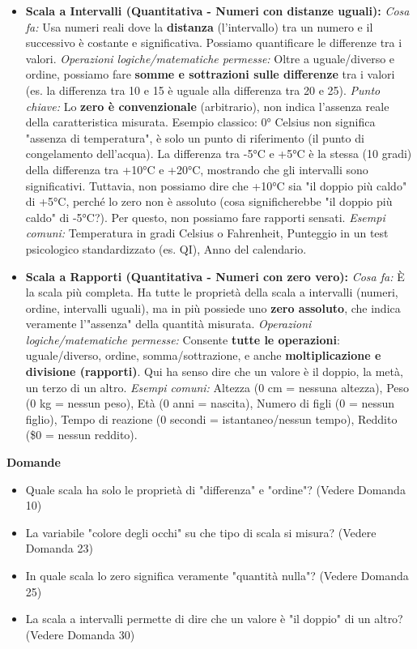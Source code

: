 \documentclass[12pt, a4paper]{article}
\newenvironment{reflectionbox}{%
    \begin{framed}\par\medskip\noindent
    \textbf{\color{boxtitlecolor}Domande} \par
    \begin{itemize}[leftmargin=*, label=$\blacktriangleright$]
}{%
    \end{itemize}\par\medskip
    \end{framed}
}
\begin{document}
\begin{itemize}
\begin{itemize}
            \item \textbf{Scala a Intervalli (Quantitativa - Numeri con distanze uguali):}
                \subitem \textit{Cosa fa:} Usa numeri reali dove la \textbf{distanza} (l'intervallo) tra un numero e il successivo è costante e significativa. Possiamo quantificare le differenze tra i valori.
                \subitem \textit{Operazioni logiche/matematiche permesse:} Oltre a uguale/diverso e ordine, possiamo fare \textbf{somme e sottrazioni sulle differenze} tra i valori (es. la differenza tra 10 e 15 è uguale alla differenza tra 20 e 25).
                \subitem \textit{Punto chiave:} Lo \textbf{zero è convenzionale} (arbitrario), non indica l'assenza reale della caratteristica misurata. Esempio classico: 0° Celsius non significa "assenza di temperatura", è solo un punto di riferimento (il punto di congelamento dell'acqua). La differenza tra -5°C e +5°C è la stessa (10 gradi) della differenza tra +10°C e +20°C, mostrando che gli intervalli sono significativi. Tuttavia, non possiamo dire che +10°C sia "il doppio più caldo" di +5°C, perché lo zero non è assoluto (cosa significherebbe "il doppio più caldo" di -5°C?). Per questo, non possiamo fare rapporti sensati.
                \subitem \textit{Esempi comuni:} Temperatura in gradi Celsius o Fahrenheit, Punteggio in un test psicologico standardizzato (es. QI), Anno del calendario.

            \item \textbf{Scala a Rapporti (Quantitativa - Numeri con zero vero):}
                \subitem \textit{Cosa fa:} È la scala più completa. Ha tutte le proprietà della scala a intervalli (numeri, ordine, intervalli uguali), ma in più possiede uno \textbf{zero assoluto}, che indica veramente l'"assenza" della quantità misurata.
                \subitem \textit{Operazioni logiche/matematiche permesse:} Consente \textbf{tutte le operazioni}: uguale/diverso, ordine, somma/sottrazione, e anche \textbf{moltiplicazione e divisione (rapporti)}. Qui ha senso dire che un valore è il doppio, la metà, un terzo di un altro.
                \subitem \textit{Esempi comuni:} Altezza (0 cm = nessuna altezza), Peso (0 kg = nessun peso), Età (0 anni = nascita), Numero di figli (0 = nessun figlio), Tempo di reazione (0 secondi = istantaneo/nessun tempo), Reddito (\$0 = nessun reddito).
        \end{itemize}
\end{itemize}

\begin{reflectionbox}
    \item Quale scala ha solo le proprietà di "differenza" e "ordine"? (Vedere Domanda 10)
    \item La variabile "colore degli occhi" su che tipo di scala si misura? (Vedere Domanda 23)
    \item In quale scala lo zero significa veramente "quantità nulla"? (Vedere Domanda 25)
    \item La scala a intervalli permette di dire che un valore è "il doppio" di un altro? (Vedere Domanda 30)
\end{reflectionbox}
\end{document}
